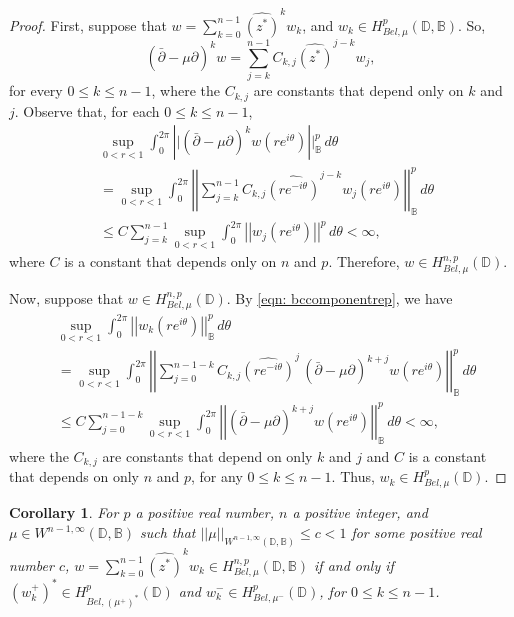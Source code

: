 \documentclass[12pt,reqno]{amsart}
\newtheorem{corr}[theorem]{Corollary}
\theoremstyle{definition}
\theoremstyle{remark}
\newcommand{\p}{\partial}
\newcommand{\dbar}{\bar\partial}
\newcommand{\bc}{\mathbb{B}}
\newcommand{\disk}{\mathbb{D}}
\begin{document}
\begin{proof}




First, suppose that $w = \sum_{k=0}^{n-1}\widehat{(z^*)}^k w_k$, and $w_k \in H^{p}_{Bel,\mu}(\disk,\bc)$. So, 
\[
     \left(\dbar- \mu\p\right)^k  w = \sum_{j = k}^{n-1} C_{k,j} \widehat{(z^*)}^{j-k} w_j,
\]
for every $0 \leq k \leq n-1$, where the $C_{k,j}$ are constants that depend only on $k$ and $j$. Observe that, for each $0 \leq k \leq n-1$, 
\begin{align*}
    & \sup_{0 < r <1} \int_0^{2\pi} \left||  (\dbar - \mu \p)^k  w(re^{i\theta})  \right||_{\bc}^p \,d\theta \\
    &= \sup_{0 < r <1} \int_0^{2\pi} \left|\left| \sum_{j = k}^{n-1} C_{k,j} \widehat{(re^{-i\theta})}^{j-k} w_j(re^{i\theta})  \right|\right|_\bc^p \,d\theta \\
    &\leq C \sum_{j = k}^{n-1} \sup_{0 < r < 1 } \int_0^{2\pi} \left|\left|w_j(re^{i\theta})  \right|\right|^p \,d\theta < \infty,
\end{align*}
where $C$ is a constant that depends only on $n$ and $p$. Therefore, $w \in H_{Bel,\mu}^{n,p}(\disk)$.



Now, suppose that $w \in H^{n,p}_{Bel,\mu}(\disk)$. By \eqref{eqn: bccomponentrep}, we have
\begin{align*}
    &\sup_{0 < r <1} \int_0^{2\pi} \left|\left| w_k(re^{i\theta})  \right|\right|_\bc^p \,d\theta \\
    &= \sup_{0 < r <1} \int_0^{2\pi} \left|\left|\sum_{j=0}^{n-1-k}C_{k,j} \widehat{(re^{-i\theta})}^j\, \left(\dbar - \mu \p\right)^{k+j}w(re^{i\theta})  \right|\right|_\bc^p \,d\theta \\
    &\leq C \sum_{j=0}^{n-1-k}\sup_{0 < r < 1} \int_0^{2\pi} \left|\left| \left(\dbar - \mu \p\right)^{k+j}w(re^{i\theta})  \right|\right|_\bc^p \,d\theta < \infty,
\end{align*}
 where the $C_{k,j}$ are constants that depend on only $k$ and $j$ and $C$ is a constant that depends on only $n$ and $p$, for any $0 \leq k \leq n-1$. Thus, $w_k \in H^p_{Bel,\mu}(\disk)$.


\end{proof}

\begin{corr}\label{corr: bcbelhpcompinhp}
    For $p$ a positive real number, $n$ a positive integer, and $\mu \in W^{n-1,\infty}(\disk,\bc)$ such that $||\mu||_{W^{n-1,\infty}(\disk,\bc)}\leq c < 1$ for some positive real number $c$, $w = \sum_{k=0}^{n-1} \widehat{ (z^*)}^k w_k \in H^{n,p}_{Bel,\mu}(\disk,\bc)$ if and only if $(w_k^+)^* \in H^p_{Bel,(\mu^+)^*}(\disk)$ and $w^-_k \in H^p_{Bel,\mu^-}(\disk)$, for $0 \leq k \leq n-1$. 
\end{corr}
\end{document}
